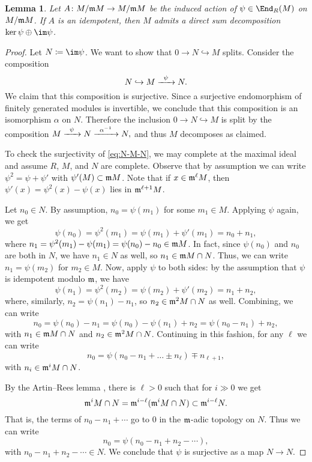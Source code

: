 \documentclass[12pt]{article}
\let\inc\hookrightarrow
\theoremstyle{theorem}
\numberwithin{thm}{section}
\newtheorem{lem}[thm]{Lemma}
\theoremstyle{definition}
\begin{document}
\begin{lem}\label{lem:idemp}
  Let $A\colon M/\mathfrak m M\to M/\mathfrak m M$ be the induced action of $\psi\in\End_R(M)$ on $M/\mathfrak m M$. If $A$ is an idempotent, then $M$ admits a direct sum decomposition $\ker\psi \oplus \im\psi$.
\end{lem}
\begin{proof}
  Let $N \coloneqq \im\psi$. We want to show that $0 \to N \inc M$ splits. Consider the composition
  \begin{equation}\label{eq:N-M-N}
    N \inc M \xra{\psi} N.
  \end{equation}
  We claim that this composition is surjective. Since a surjective endomorphism of finitely generated modules is invertible, we conclude that this composition is an isomorphism $\alpha$ on $N$.
  Therefore the inclusion $ 0 \to N \inc M $ is split by the composition
  \( M \xra{\psi} N \xra{\alpha\inv} N, \)
  and thus $M$ decomposes as claimed.

  To check the surjectivity of \eqref{eq:N-M-N}, we may complete at the maximal ideal and assume $R$, $M$, and $N$ are complete. Observe that by assumption we can write $\psi^2 = \psi + \psi'$ with $\psi'(M)\subset \mathfrak m M$.
  Note that if $x \in \mathfrak m^\ell M$, then $\psi'(x) = \psi^2(x) - \psi(x)$ lies in $\mathfrak m^{\ell+1}M$.


  Let $n_0\in N$. By assumption, $n_0 = \psi(m_1)$ for some $m_1\in M$. Applying $\psi$ again, we get
  \[ \psi(n_0) = \psi^2(m_1) = \psi(m_1) + \psi'(m_1) = n_0 + n_1, \]
  where $n_1 = \psi^2(m_1) - \psi(m_1) = \psi(n_0) - n_0 \in \mathfrak m M$. In fact, since $\psi(n_0)$ and $n_0$ are both in $N$, we have $n_1\in N$ as well, so $n_1\in \mathfrak m M\cap N$. Thus, we can write $n_1 = \psi(m_2)$ for $m_2\in M$.
  Now, apply $\psi$ to both sides: by the assumption that $\psi$ is idempotent modulo $\mathfrak m$, we have
  \[ \psi(n_1)=\psi^2(m_2) = \psi(m_2) + \psi'(m_2) = n_1 + n_2, \]
  where, similarly, $n_2 = \psi(n_1) - n_1$, so $n_2 \in \mathfrak m^2M\cap N$ as well.
  Combining, we can write
  \[ n_0 = \psi(n_0) - n_1 = \psi(n_0) - \psi(n_1) + n_2 = \psi(n_0 - n_1) + n_2, \]
  with $n_1\in \mathfrak m M\cap N$ and $n_2\in \mathfrak m^2M\cap N$. Continuing in this fashion, for any $\ell$ we can write
  \[ n_0=\psi(n_0-n_1+\dots \pm n_{\ell}) \mp n_{\ell+1}, \]
  with $n_i \in \mathfrak m^i M\cap N$.

  By the Artin--Rees lemma \cite[Lemma~5.1]{Eisenbud95}, there is $\ell>0$ such that for $i\gg0$ we get
  \[ \mathfrak m^i M\cap N = \mathfrak m^{i-\ell} ( \mathfrak m^i M\cap N)\subset \mathfrak m^{i-\ell} N. \]
  That is, the terms of $n_0-n_1+\cdots$ go to 0 in the $\mathfrak m$-adic topology on $N$. Thus we can write
  \[ n_0 = \psi(n_0-n_1+n_2-\cdots), \]
  with $n_0-n_1+n_2-\cdots\in N$. We conclude that $\psi$ is surjective as a map $N\to N$.
\end{proof}
\end{document}
